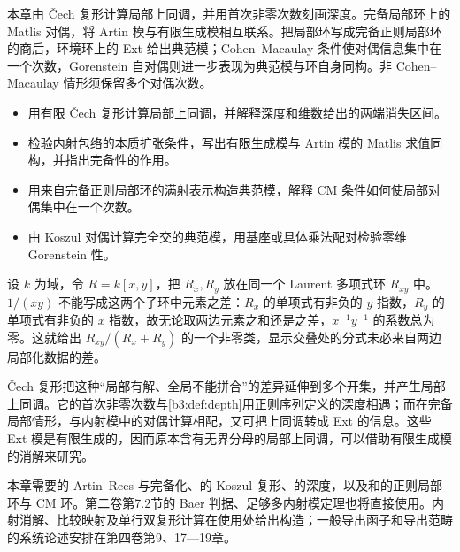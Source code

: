 

\begin{chapterabstract}
	本章由 Čech 复形计算局部上同调，并用首次非零次数刻画深度。完备局部环上的 Matlis 对偶，将 Artin 模与有限生成模相互联系。把局部环写成完备正则局部环的商后，环境环上的 Ext 给出典范模；Cohen–Macaulay 条件使对偶信息集中在一个次数，Gorenstein 自对偶则进一步表现为典范模与环自身同构。非 Cohen–Macaulay 情形须保留多个对偶次数。
\end{chapterabstract}

\begin{learninggoals}
	\begin{itemize}
		\item 用有限 Čech 复形计算局部上同调，并解释深度和维数给出的两端消失区间。
		\item 检验内射包络的本质扩张条件，写出有限生成模与 Artin 模的 Matlis 求值同构，并指出完备性的作用。
		\item 用来自完备正则局部环的满射表示构造典范模，解释 CM 条件如何使局部对偶集中在一个次数。
		\item 由 Koszul 对偶计算完全交的典范模，用基座或具体乘法配对检验零维 Gorenstein 性。
	\end{itemize}
\end{learninggoals}

设 \(k\) 为域，令 \(R=k[x,y]\)，把 \(R_x,R_y\) 放在同一个 Laurent 多项式环 \(R_{xy}\) 中。\(1/(xy)\) 不能写成这两个子环中元素之差：\(R_x\) 的单项式有非负的 \(y\) 指数，\(R_y\) 的单项式有非负的 \(x\) 指数，故无论取两边元素之和还是之差，\(x^{-1}y^{-1}\) 的系数总为零。这就给出 \(R_{xy}/(R_x+R_y)\) 的一个非零类，显示交叠处的分式未必来自两边局部化数据的差。

\ProseParagraphBreak

Čech 复形把这种“局部有解、全局不能拼合”的差异延伸到多个开集，并产生局部上同调。它的首次非零次数与\cref{b3:def:depth}用正则序列定义的深度相遇；而在完备局部情形，与内射模中的对偶计算相配，又可把上同调转成 Ext 的信息。这些 Ext 模是有限生成的，因而原本含有无界分母的局部上同调，可以借助有限生成模的消解来研究。

\ProseParagraphBreak

本章需要的 Artin–Rees 与完备化、的 Koszul 复形、的深度，以及和的正则局部环与 CM 环。第二卷第7.2节的 Baer 判据、足够多内射模定理也将直接使用。内射消解、比较映射及单行双复形计算在使用处给出构造；一般导出函子和导出范畴的系统论述安排在第四卷第9、17—19章。

